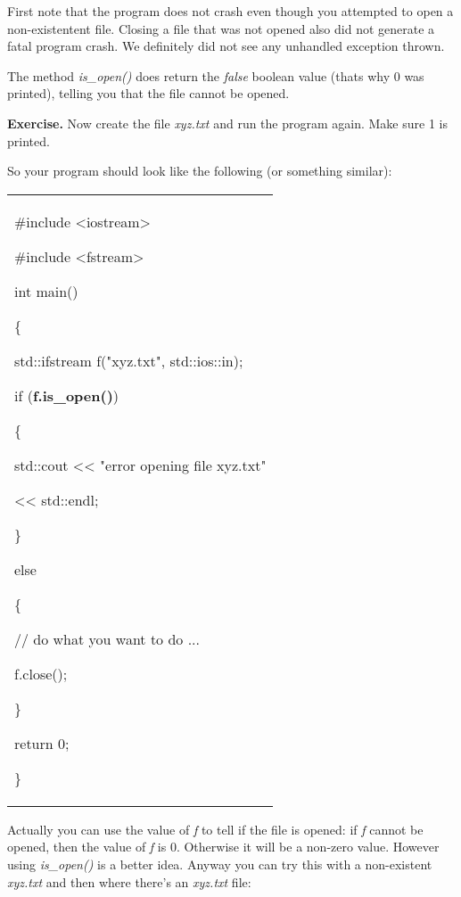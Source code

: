 \documentclass[
]{article}
\begin{document}
First note that the program does not crash even though you attempted to
open a non-existentent file. Closing a file that was not opened also did
not generate a fatal program crash. We definitely did not see any
unhandled exception thrown.

The method \emph{is\_open()} does return the \emph{false} boolean value
(that\textquotesingle s why 0 was printed), telling you that the file
cannot be opened.

\textbf{Exercise.} Now create the file \emph{xyz.txt} and run the
program again. Make sure 1 is printed.

So your program should look like the following (or something similar):

\begin{longtable}[]{@{}
  >{\raggedright\arraybackslash}p{}@{}}
\toprule\noalign{}
 \\
\midrule\noalign{}
\endhead
\bottomrule\noalign{}
\endlastfoot
\#include \textless iostream\textgreater{}

\#include \textless fstream\textgreater{}

int main()

\{

std::ifstream f("xyz.txt", std::ios::in);

if (\textbf{f.is\_open()})

\{

std::cout \textless\textless{} "error opening file xyz.txt"

\textless\textless{} std::endl;

\}

else

\{

// do what you want to do ...

f.close();

\}

return 0;

\} \\
\end{longtable}

Actually you can use the value of \emph{f} to tell if the file is
opened: if \emph{f} cannot be opened, then the value of \emph{f} is 0.
Otherwise it will be a non-zero value. However using \emph{is\_open()}
is a better idea. Anyway you can try this with a non-existent
\emph{xyz.txt} and then where there's an \emph{xyz.txt} file:
\end{document}
